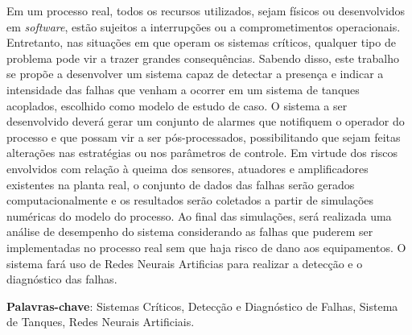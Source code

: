 Em um processo real, todos os recursos utilizados, sejam físicos ou
desenvolvidos em {\it software}, estão sujeitos a interrupções ou a
comprometimentos operacionais. Entretanto, nas situações em que operam os
sistemas críticos, qualquer tipo de problema pode vir a trazer grandes
consequências. Sabendo disso, este trabalho se propõe a desenvolver um sistema
capaz de detectar a presença e indicar a intensidade das falhas que venham a
ocorrer em um sistema de tanques acoplados, escolhido como modelo de estudo de
caso. O sistema a ser desenvolvido deverá gerar um conjunto de alarmes que
notifiquem o operador do processo e que possam vir a ser pós-processados,
possibilitando que sejam feitas alterações nas estratégias ou nos parâmetros de
controle. Em virtude dos riscos envolvidos com relação à queima dos sensores,
atuadores e amplificadores existentes na planta real, o conjunto de dados das
falhas serão gerados computacionalmente e os resultados serão coletados a partir
de simulações numéricas do modelo do processo. Ao final das simulações, será
realizada uma análise de desempenho do sistema considerando as falhas que
puderem ser implementadas no processo real sem que haja risco de dano aos
equipamentos. O sistema fará uso de Redes Neurais Artificias para realizar a
detecção e o diagnóstico das falhas.

\vspace{1.5ex}

{\bf Palavras-chave}: Sistemas Críticos, Detecção e Diagnóstico de Falhas,
Sistema de Tanques, Redes Neurais Artificiais.
